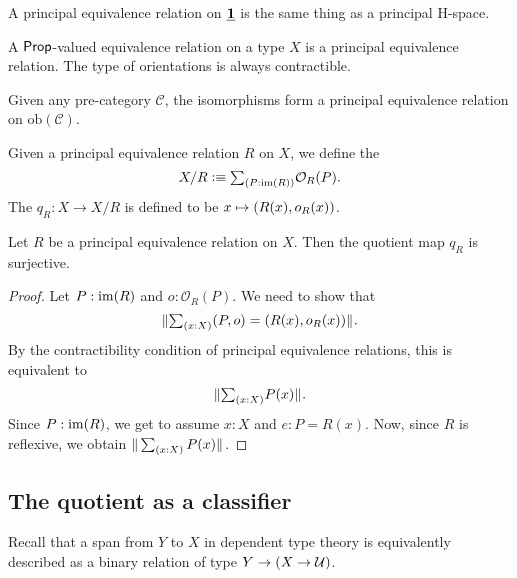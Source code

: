 \begin{eg}
A principal equivalence relation on $\underline{\mathbf{1}}$ is the same thing as a principal H-space.
\end{eg}

\begin{eg}
A $\mathsf{Prop}$-valued equivalence relation on a type $X$ is a principal equivalence relation. The type of orientations is always contractible.
\end{eg}

\begin{eg}
Given any pre-category $\mathcal{C}$, the isomorphisms form a principal equivalence relation on $\mathrm{ob}(\mathcal{C})$. 
\end{eg}

\begin{defn}
Given a principal equivalence relation $R$ on $X$, we define the  
\begin{equation*}
X/R\defeq\sm{P:\im(R)}\mathcal{O}_R(P).
\end{equation*}
The  $q_R:X\to X/R$ is defined to be $x\mapsto{\mathopen{}(R(x),o_R(x))\mathclose{}}$. 
\end{defn}

\begin{lem}
Let $R$ be a principal equivalence relation on $X$. Then the quotient map $q_R$ is surjective.
\end{lem}

\begin{proof}
Let $P:\operatorname{im}(R)$ and $o:\mathcal{O}_R(P)$. We need to show that
\begin{equation*}
\brck{\sm{x:X}\pairr{P,o}=\pairr{R(x),o_R(x)}}.
\end{equation*}
By the contractibility condition of principal equivalence relations, this is equivalent to
\begin{equation*}
\brck{\sm{x:X}P(x)}.
\end{equation*}
Since $P:\operatorname{im}(R)$, we get to assume $x:X$ and $e:P=R(x)$. Now, since $R$ is reflexive, we obtain $\brck{\sm{x:X}P(x)}$. 
\end{proof}

\subsection{The quotient as a classifier}

Recall that a span from $Y$ to $X$ in dependent type theory is equivalently described as a binary relation of type $Y\to (X\to \mathcal{U})$. 


